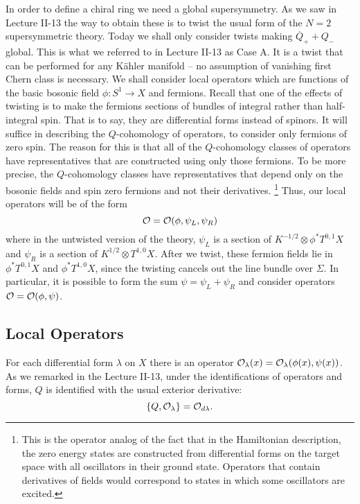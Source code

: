 In order to define a chiral ring we need a global supersymmetry. As
we saw in Lecture II-13 the way to obtain these is to twist the usual
form of the $N=2$ supersymmetric theory.
Today we shall only consider  twists making $\overline Q_++Q_-$
global. This is what we referred to in  Lecture II-13 as Case A.  It
is a twist that can be performed for any K\"ahler manifold -- no
assumption of vanishing first Chern class
is necessary. We shall consider local operators
which are functions of the basic bosonic field $\phi\colon S^1\to X$
and fermions. Recall that  one of the effects of twisting is to make the
fermions sections of bundles of integral rather than half-integral
spin. That is to say, they are differential forms instead of spinors.
It will suffice in describing the
$Q$-cohomology of operators,  to consider only fermions of zero spin.
The reason for this is that all of the $Q$-cohomology classes of operators
have representatives that are constructed using only those fermions.
To be more precise, the $Q$-cohomology classes have representatives
that depend only on the bosonic fields and spin zero fermions and
not their derivatives.
\footnote{This is the operator analog of the fact that in the Hamiltonian
description, the zero energy states are constructed from differential
forms on the target space with all oscillators in their ground state.
Operators that contain derivatives of fields would correspond to states
in which some oscillators are excited.}
Thus, our local operators will be of the form
$${\cal O}={\cal O}(\phi,\psi_L,\psi_R)$$
where in the untwisted version of the theory, $\psi_L$ is a section of
$K^{-1/2}\otimes \phi^*T^{0,1}X$ and $\psi_R$ is a section of
$K^{1/2}\otimes T^{1,0}X$.
After we twist, these fermion fields lie in
$\phi^*T^{0,1}X$ and $\phi^*T^{1,0}X$, since the twisting cancels out
the line bundle over $\Sigma$.
In particular, it is possible to form the sum $\psi=\psi_L+\psi_R$ and
consider operators ${\cal O}={\cal O}(\phi,\psi)$.

\subsection{Local Operators}

For each differential form $\lambda$ on $X$ there is an operator ${\cal
O}_\lambda(x)={\cal O}_\lambda(\phi(x),\psi(x))$. As we remarked in
the Lecture II-13, under the identifications of operators and forms, $Q$
is identified with the usual exterior derivative:
$$\{Q,{\cal O}_\lambda\}={\cal O}_{d\lambda}.$$



